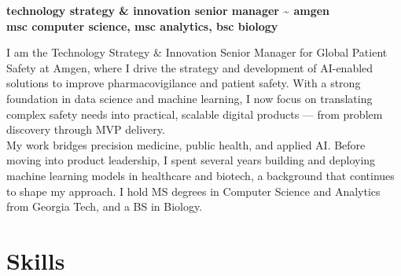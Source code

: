 \documentclass[12pt,a4paper]{moderncv}
\begin{document}
\vspace*{-4\baselineskip}
\makecvtitle
\vspace{-1.5\baselineskip}

\begin{flushright}
\textbf{\large technology strategy \& innovation senior manager \textasciitilde{} amgen} \\
\textbf{\large msc computer science, msc analytics, bsc biology} \\
\end{flushright}

I am the Technology Strategy \& Innovation Senior Manager for Global Patient Safety at Amgen, where I drive the strategy and development of AI-enabled solutions to improve pharmacovigilance and patient safety. With a strong foundation in data science and machine learning, I now focus on translating complex safety needs into practical, scalable digital products — from problem discovery through MVP delivery.\\

My work bridges precision medicine, public health, and applied AI. Before moving into product leadership, I spent several years building and deploying machine learning models in healthcare and biotech, a background that continues to shape my approach. I hold MS degrees in Computer Science and Analytics from Georgia Tech, and a BS in Biology.\\

\section{Skills}
\end{document}
